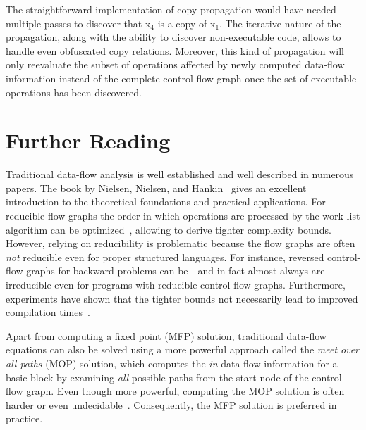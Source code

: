 The straightforward implementation of copy propagation would have needed
multiple passes to discover that x$_4$ is a copy of x$_1$.  The iterative
nature of the propagation, along with the ability to discover non-executable
code, allows to handle even obfuscated copy relations. Moreover, this kind of
propagation will only reevaluate the subset of operations affected by newly
computed data-flow information instead of the complete control-flow graph once
the set of executable operations has been discovered.

\section{Further Reading}
\label{novillo:sec:further_reading}

Traditional data-flow analysis is well established and well described in
numerous papers. The book by Nielsen, Nielsen, and
Hankin~\cite{novillo:bib:NNH99} gives an excellent introduction to the
theoretical foundations and practical applications.
For reducible flow graphs the order in which operations are processed by the
work list algorithm can be
optimized~\cite{novillo:bib:HU73,novillo:bib:KU76,novillo:bib:NNH99}, allowing
to derive tighter complexity bounds. However, relying on reducibility is
problematic because the flow graphs are often \emph{not} reducible even for
proper structured languages. For instance, reversed control-flow graphs for backward
problems can be---and in fact almost always are---irreducible even for programs
with reducible control-flow graphs. Furthermore, experiments have shown that the
tighter bounds not necessarily lead to improved compilation
times~\cite{novillo:bib:CTK06}.

Apart from computing a fixed point (MFP) solution, traditional data-flow
equations can also
be solved using a more powerful approach called the \emph{meet over all paths}
(MOP) solution, which computes the \emph{in} data-flow information for a basic
block by examining \emph{all} possible paths from the start node of the control-flow graph. Even though more powerful, computing the MOP solution is often
harder or even undecidable~\cite{novillo:bib:NNH99}. Consequently,
the MFP solution is preferred in practice.

